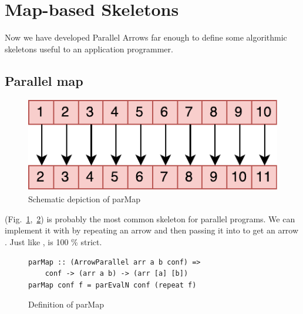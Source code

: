 
\FloatBarrier
\section{Map-based Skeletons}
\label{sec:map-skeletons}
Now we have developed Parallel Arrows far enough to define some algorithmic skeletons useful to an application programmer.
\subsection{Parallel map}
\begin{figure}[h]
	\includegraphics[scale=0.7]{images/parMap}
	\caption{Schematic depiction of parMap}
	\label{fig:parMapImg}
\end{figure}
 (Fig.~\ref{fig:parMapImg},~\ref{fig:parMap}) is probably the most common skeleton for parallel programs. We can implement it with  by repeating an arrow  and then passing it into  to get an arrow . 
Just like ,  is 100 \% strict.
\begin{figure}[h]
\begin{lstlisting}[frame=htrbl]
parMap :: (ArrowParallel arr a b conf) =>
	conf -> (arr a b) -> (arr [a] [b])
parMap conf f = parEvalN conf (repeat f)
\end{lstlisting}
\caption{Definition of parMap}
\label{fig:parMap}
\end{figure}

